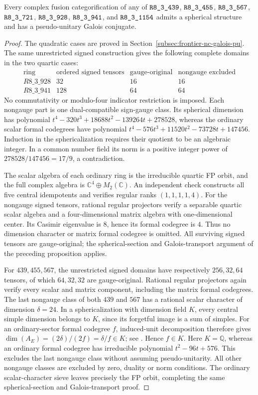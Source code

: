 \begin{proposition}
Every complex fusion categorification of any of
$\sha{R8_3_439}$, $\sha{R8_3_455}$, $\sha{R8_3_567}$, $\sha{R8_3_721}$,
$\sha{R8_3_928}$, $\sha{R8_3_941}$, and $\sha{R8_3_1154}$
admits a spherical structure and has a pseudo-unitary Galois conjugate.
\end{proposition}
\begin{proof}
The quadratic cases are proved in
Section~\ref{subsec:frontier-nc-galois-pu}.
The same unrestricted signed construction gives the following complete
domains in the two quartic cases:
\[
\begin{array}{c|r|r|r}
\text{ring}&\text{ordered signed tensors}&\text{gauge-original}&
 \text{nongauge excluded}\\\hline
R8\_3\_928&32&16&16\\
R8\_3\_941&128&64&64
\end{array}
\]
No commutativity or modulo-four indicator restriction is imposed.
Each nongauge part is one dual-compatible sign-gauge class. Its
spherical dimension has polynomial
$t^4-320t^3+18688t^2-139264t+278528$, whereas the ordinary scalar
formal codegrees have polynomial
$t^4-576t^3+11520t^2-73728t+147456$.
Induction in the sphericalization requires their quotient to be an
algebraic integer. In a common number field its norm is a positive
integer power of $278528/147456=17/9$, a contradiction.

The scalar algebra of each ordinary ring is the irreducible quartic
FP orbit, and the full complex algebra is
$\mathbb C^4\oplus M_2(\mathbb C)$.
An independent check constructs all five central idempotents and verifies
regular ranks $(1,1,1,1,4)$. For the nongauge signed tensors, rational
regular projectors verify a separable quartic scalar algebra and a
four-dimensional matrix algebra with one-dimensional center.
Its Casimir eigenvalue is $8$, hence its formal codegree is $4$.
Thus no dimension character or matrix formal codegree is omitted.
All surviving signed tensors are gauge-original; the spherical-section
and Galois-transport argument of the preceding proposition applies.

For $439,455,567$, the unrestricted signed domains have respectively
$256,32,64$ tensors, of which $64,32,32$ are gauge-original. Rational
regular projectors again verify every scalar and matrix component,
including the matrix formal codegrees. The last nongauge class of both
$439$ and $567$ has a rational scalar character of dimension $\delta=24$.
In a sphericalization with dimension field $K$, every central simple
dimension belongs to $K$, since its forgetful image is a sum of simples.
For an ordinary-sector formal codegree $f$, induced-unit decomposition
therefore gives $\dim(A_E)=(2\delta)/(2f)=\delta/f\in K$; see
\cite[Theorem~2.13 and Corollary~2.15]{OstrikPiv3}. Hence $f\in K$.
Here $K=\mathbb Q$, whereas an ordinary formal codegree has irreducible
polynomial $t^2-96t+576$. This excludes the last nongauge class without
assuming pseudo-unitarity. All other nongauge classes are excluded by
zero, duality or norm conditions. The ordinary scalar-character sieve
leaves precisely the FP orbit, completing the same spherical-section
and Galois-transport proof.
\end{proof}

